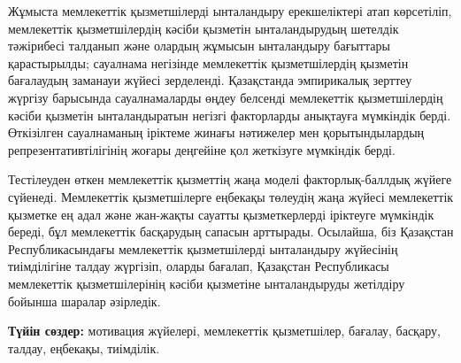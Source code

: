 Жұмыста мемлекеттік қызметшілерді ынталандыру ерекшеліктері атап
көрсетіліп, мемлекеттік қызметшілердің кәсіби қызметін ынталандырудың
шетелдік тәжірибесі талданып және олардың жұмысын ынталандыру бағыттары
қарастырылды; сауалнама негізінде мемлекеттік қызметшілердің қызметін
бағалаудың заманауи жүйесі зерделенді. Қазақстанда эмпирикалық зерттеу
жүргізу барысында сауалнамаларды өңдеу белсенді мемлекеттік
қызметшілердің кәсіби қызметін ынталандыратын негізгі факторларды
анықтауға мүмкіндік берді. Өткізілген сауалнаманың іріктеме жинағы
нәтижелер мен қорытындылардың репрезентативтілігінің жоғары деңгейіне
қол жеткізуге мүмкіндік берді.

Тестілеуден өткен мемлекеттік қызметтің жаңа моделі факторлық-баллдық
жүйеге сүйенеді. Мемлекеттік қызметшілерге еңбекақы төлеудің жаңа жүйесі
мемлекеттік қызметке ең адал және жан-жақты сауатты қызметкерлерді
іріктеуге мүмкіндік береді, бұл мемлекеттік басқарудың сапасын
арттырады. Осылайша, біз Қазақстан Республикасындағы мемлекеттік
қызметшілерді ынталандыру жүйесінің тиімділігіне талдау жүргізіп, оларды
бағалап, Қазақстан Республикасы мемлекеттік қызметшілерінің кәсіби
қызметіне ынталандыруды жетілдіру бойынша шаралар әзірледік.

\hspace{1.5em} {\bfseries Түйін сөздер:} мотивация жүйелері, мемлекеттік қызметшілер,
бағалау, басқару, талдау, еңбекақы, тиімділік.

\vspace{1em}

